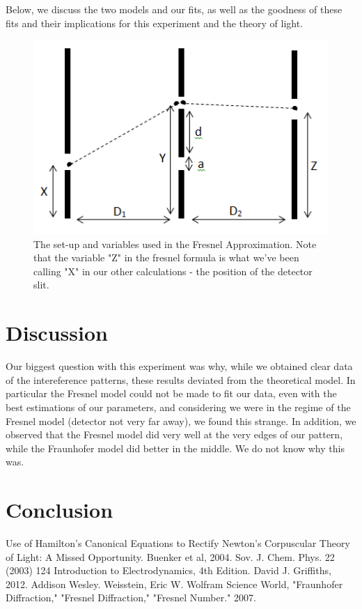 \documentclass[prb,preprint]{revtex4-1}
\begin{document}
Below, we discuss the two models and our fits, as well as the goodness of these fits and their implications for this experiment and the theory of light.

\begin{figure}[h!]
\centering
\includegraphics[width=6in]{fresnel_diagram.png}
\caption{The set-up and variables used in the Fresnel Approximation. Note that the variable "Z" in the fresnel formula is what we've been calling "X" in our other calculations - the position of the detector slit.}
\label{fresnel_diagram}
\end{figure}

\section{Discussion}

Our biggest question with this experiment was why, while we obtained clear data of the intereference patterns, these results deviated from the theoretical model.  In particular the Fresnel model could not be made to fit our data, even with the best estimations of our parameters, and considering we were in the regime of the Fresnel model (detector not very far away), we found this strange. In addition, we observed that the Fresnel model did very well at the very edges of our pattern, while the Fraunhofer model did better in the middle.  We do not know why this was.  

\section{Conclusion}

 
\begin{thebibliography}{3}
 Use of Hamilton's Canonical Equations to Rectify Newton's Corpuscular Theory of Light:  A Missed Opportunity.  Buenker et al, 2004.  Sov. J. Chem. Phys. 22 (2003) 124
 Introduction to Electrodynamics, 4th Edition.  David J. Griffiths, 2012.  Addison Wesley.
Weisstein, Eric W. Wolfram Science World, "Fraunhofer Diffraction," "Fresnel Diffraction," "Fresnel Number." 2007. 

\end{thebibliography}
\end{document}
